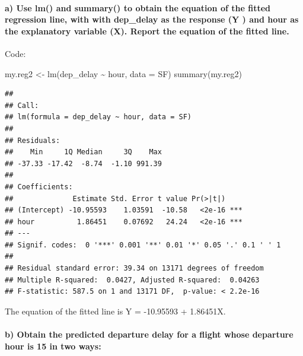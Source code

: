 \documentclass[
]{article}
\newenvironment{Shaded}{\begin{snugshade}}{\end{snugshade}}
\newcommand{\AttributeTok}[1]{\textcolor[rgb]{0.77,0.63,0.00}{#1}}
\newcommand{\FunctionTok}[1]{\textcolor[rgb]{0.00,0.00,0.00}{#1}}
\newcommand{\NormalTok}[1]{#1}
\newcommand{\OtherTok}[1]{\textcolor[rgb]{0.56,0.35,0.01}{#1}}
\newcommand{\SpecialCharTok}[1]{\textcolor[rgb]{0.00,0.00,0.00}{#1}}
\begin{document}
\hypertarget{a-use-lm-and-summary-to-obtain-the-equation-of-the-fitted-regression-line-with-with-dep_delay-as-the-response-y-and-hour-as-the-explanatory-variable-x.-report-the-equation-of-the-fitted-line.}{%
\paragraph{a) Use lm() and summary() to obtain the equation of the
fitted regression line, with with dep\_delay as the response (Y ) and
hour as the explanatory variable (X). Report the equation of the fitted
line.}\label{a-use-lm-and-summary-to-obtain-the-equation-of-the-fitted-regression-line-with-with-dep_delay-as-the-response-y-and-hour-as-the-explanatory-variable-x.-report-the-equation-of-the-fitted-line.}}

\hfill\break
Code:

\begin{Shaded}
\begin{Highlighting}[]
\NormalTok{my.reg2 }\OtherTok{\textless{}{-}} \FunctionTok{lm}\NormalTok{(dep\_delay }\SpecialCharTok{\textasciitilde{}}\NormalTok{ hour, }\AttributeTok{data =}\NormalTok{ SF)}
\FunctionTok{summary}\NormalTok{(my.reg2)}
\end{Highlighting}
\end{Shaded}

\begin{verbatim}
## 
## Call:
## lm(formula = dep_delay ~ hour, data = SF)
## 
## Residuals:
##    Min     1Q Median     3Q    Max 
## -37.33 -17.42  -8.74  -1.10 991.39 
## 
## Coefficients:
##              Estimate Std. Error t value Pr(>|t|)    
## (Intercept) -10.95593    1.03591  -10.58   <2e-16 ***
## hour          1.86451    0.07692   24.24   <2e-16 ***
## ---
## Signif. codes:  0 '***' 0.001 '**' 0.01 '*' 0.05 '.' 0.1 ' ' 1
## 
## Residual standard error: 39.34 on 13171 degrees of freedom
## Multiple R-squared:  0.0427, Adjusted R-squared:  0.04263 
## F-statistic: 587.5 on 1 and 13171 DF,  p-value: < 2.2e-16
\end{verbatim}

The equation of the fitted line is Y = -10.95593 + 1.86451X.

\hypertarget{b-obtain-the-predicted-departure-delay-for-a-flight-whose-departure-hour-is-15-in-two-ways}{%
\paragraph{b) Obtain the predicted departure delay for a flight whose
departure hour is 15 in two
ways:}\label{b-obtain-the-predicted-departure-delay-for-a-flight-whose-departure-hour-is-15-in-two-ways}}
\end{document}
